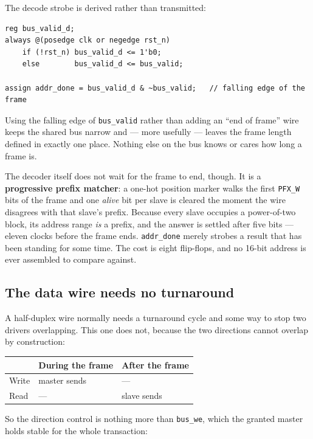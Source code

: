\documentclass[11pt,a4paper]{article}
\newcommand{\sig}[1]{\texttt{#1}}
\begin{document}
The decode strobe is derived rather than transmitted:

\begin{lstlisting}
reg bus_valid_d;
always @(posedge clk or negedge rst_n)
    if (!rst_n) bus_valid_d <= 1'b0;
    else        bus_valid_d <= bus_valid;

assign addr_done = bus_valid_d & ~bus_valid;   // falling edge of the frame
\end{lstlisting}

Using the falling edge of \sig{bus\_valid} rather than adding an
``end of frame'' wire keeps the shared bus narrow and --- more
usefully --- leaves the frame length defined in exactly one place. Nothing
else on the bus knows or cares how long a frame is.

The decoder itself does not wait for the frame to end, though. It is a
\textbf{progressive prefix matcher}: a one-hot position marker walks the first
\sig{PFX\_W} bits of the frame and one \emph{alive} bit per slave is cleared
the moment the wire disagrees with that slave's prefix. Because every slave
occupies a power-of-two block, its address range \emph{is} a prefix, and the
answer is settled after five bits --- eleven clocks before the frame ends.
\sig{addr\_done} merely strobes a result that has been standing for some time.
The cost is eight flip-flops, and no 16-bit address is ever assembled to
compare against.

\subsection{The data wire needs no turnaround}

A half-duplex wire normally needs a turnaround cycle and some way to stop two
drivers overlapping. This one does not, because the two directions cannot
overlap by construction:

\begin{center}\small
\begin{tabular}{@{}lll@{}}
\toprule
& \textbf{During the frame} & \textbf{After the frame}\\
\midrule
Write & master sends & ---\\
Read  & ---          & slave sends\\
\bottomrule
\end{tabular}
\end{center}

So the direction control is nothing more than \sig{bus\_we}, which the
granted master holds stable for the whole transaction:
\end{document}
